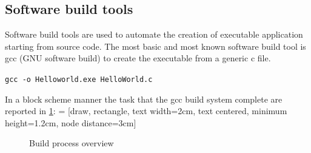 \documentclass[../main.tex]{subfiles}
\begin{document}
\subsection{Software build tools}
Software build tools are used to automate the creation of executable application starting from source code. The most basic and most known software build tool is gcc (GNU software build) to create the executable from a generic c file. 
\begin{center}
    \texttt{gcc -o Helloworld.exe HelloWorld.c}
\end{center}
In a block scheme manner the task that the gcc build system complete are reported in \ref{Buildpro}:
 = [draw, rectangle, text width=2cm, text centered, minimum height=1.2cm, node distance=3cm]
\begin{figure}[h]
  \centering
{}
  \caption{Build process overview}
  \label{Buildpro}
\end{figure}
\end{document}
